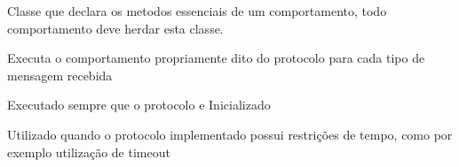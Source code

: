 \documentclass[letterpaper,10pt,brazil]{sphinxmanual}
\begin{document}
\begin{fulllineitems}
\label{api:pade.behaviours.protocols.Behaviour}
Classe que declara os metodos essenciais de um comportamento,
todo comportamento deve herdar esta classe.

\begin{fulllineitems}
\label{api:pade.behaviours.protocols.Behaviour.execute}
Executa o comportamento propriamente dito do protocolo
para cada tipo de mensagem recebida

\end{fulllineitems}


\begin{fulllineitems}
\label{api:pade.behaviours.protocols.Behaviour.on_start}
Executado sempre que o protocolo e Inicializado

\end{fulllineitems}


\begin{fulllineitems}
\label{api:pade.behaviours.protocols.Behaviour.timed_behaviour}
Utilizado quando o protocolo implementado possui restrições
de tempo, como por exemplo utilização de timeout

\end{fulllineitems}


\end{fulllineitems}

\end{document}
